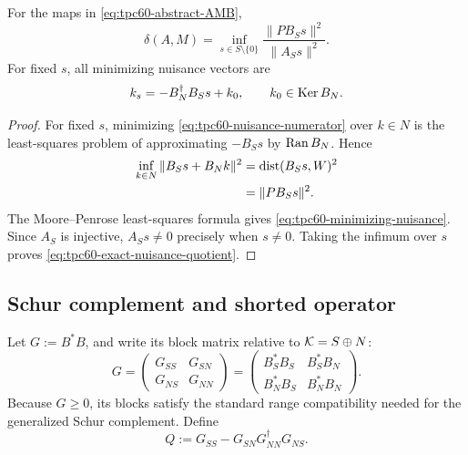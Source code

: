\begin{theorem}
\label{thm:tpc60-exact-nuisance-elimination}
For the maps in \eqref{eq:tpc60-abstract-AMB},
\begin{equation}
 \boxed{
 \delta(A,M)
 =\inf_{s\in S\setminus\{0\}}
   \frac{\|PB_Ss\|^2}{\|A_Ss\|^2}.}
 \label{eq:tpc60-exact-nuisance-quotient}
\end{equation}
For fixed \(s\), all minimizing nuisance vectors are
\begin{equation}
 k_s=-B_N^\dagger B_Ss+k_0,
 \qquad k_0\in\operatorname{Ker} B_N.
 \label{eq:tpc60-minimizing-nuisance}
\end{equation}
\end{theorem}

\begin{proof}
For fixed \(s\), minimizing \eqref{eq:tpc60-nuisance-numerator} over
\(k\in N\) is the least-squares problem of approximating \(-B_Ss\) by
\(\operatorname{Ran} B_N\).  Hence
\begin{align}
 \inf_{k\in N}\|B_Ss+B_Nk\|^2
 &=\operatorname{dist}(B_Ss,W)^2
 \notag\\
 &=\|PB_Ss\|^2.
 \label{eq:tpc60-distance-identity}
\end{align}
The Moore--Penrose least-squares formula gives
\eqref{eq:tpc60-minimizing-nuisance}.  Since \(A_S\) is injective,
\(A_Ss\ne0\) precisely when \(s\ne0\).  Taking the infimum over \(s\)
proves \eqref{eq:tpc60-exact-nuisance-quotient}.
\end{proof}

\subsection{Schur complement and shorted operator}

Let \(G:=B^*B\), and write its block matrix relative to
\(\mathcal K=S\oplus N\):
\begin{equation}
 G=
 \begin{pmatrix}
  G_{SS}&G_{SN}\\
  G_{NS}&G_{NN}
 \end{pmatrix}
 =
 \begin{pmatrix}
  B_S^*B_S&B_S^*B_N\\
  B_N^*B_S&B_N^*B_N
 \end{pmatrix}.
 \label{eq:tpc60-G-blocks}
\end{equation}
Because \(G\ge0\), its blocks satisfy the standard range compatibility
needed for the generalized Schur complement.  Define
\begin{equation}
 Q
 :=G_{SS}-G_{SN}G_{NN}^\dagger G_{NS}.
 \label{eq:tpc60-Q-Schur}
\end{equation}

